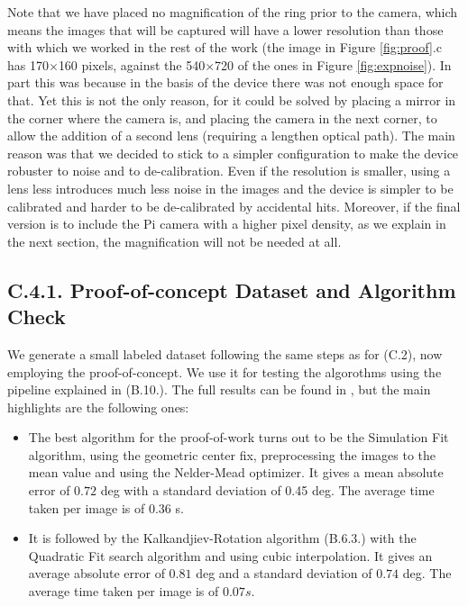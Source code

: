 \documentclass[11pt, a4paper, twoside]{article} %
\begin{document}
Note that we have placed no magnification of the ring prior to the camera, which means the images that will be captured will have a lower resolution than those with which we worked in the rest of the work (the image in Figure \ref{fig:proof}.c has 170$\times$160 pixels, against the 540$\times$720 of the ones in Figure \ref{fig:expnoise}). In part this was because in the basis of the device there was not enough space for that. Yet this is not the only reason, for it could be solved by placing a mirror in the corner where the camera is, and placing the camera in the next corner, to allow the addition of a second lens (requiring a lengthen optical path). The main reason was that we decided to stick to a simpler configuration to make the device robuster to noise and to de-calibration. Even if the resolution is smaller, using a lens less introduces much less noise in the images and the device is simpler to be calibrated and harder to be de-calibrated by accidental hits. Moreover, if the final version is to include the Pi camera with a higher pixel density, as we explain in the next section, the magnification will not be needed at all.\vspace{-0.2cm}

\subsection*{C.4.1. Proof-of-concept Dataset and Algorithm Check \vspace{-0.2cm}}

We generate a small labeled dataset following the same steps as for (C.2), now employing the proof-of-concept. We use it for testing the algorothms using the pipeline explained in (B.10.). The full results can be found in \cite{github}, but the main highlights are the following ones:\vspace{-0.3cm}
\begin{itemize}
\item The best algorithm for the proof-of-work turns out to be the Simulation Fit algorithm, using the geometric center fix, preprocessing the images to the mean value and using the Nelder-Mead optimizer. It gives a mean absolute error of $0.72$ deg with a standard deviation of 0.45 deg. The average time taken per image is of 0.36 s.\vspace{-0.15cm}

\item It is followed by the Kalkandjiev-Rotation algorithm (B.6.3.) with the Quadratic Fit search algorithm and using cubic interpolation. It gives an average absolute error of $0.81$ deg and a standard deviation of $0.74$ deg. The average time taken per image is of $0.07s$.\vspace{-0.35cm}
\end{itemize}
\end{document}
